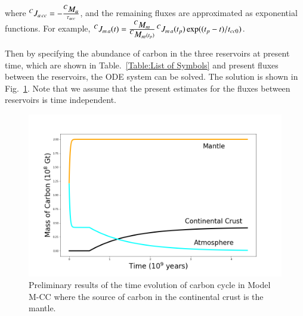 where $\mbox{${^CJ_{a\,cc}}$} = -\frac{\mbox{${^CM_{a}}$}}{\tau_{acc}}$, and the remaining fluxes are approximated as exponential functions. For example, $\mbox{${^CJ_{m\,a}}$}(t) = \frac{\mbox{${^CM_{m}}$}}{\mbox{${^CM_{m}}$}(t_p)}\, \mbox{${^CJ_{m\,a}}$}(t_p) \exp((t_p - t)/t_{cc0})$.

Then by specifying the abundance of carbon in the three reservoirs at present time, which are shown in Table.~\ref{Table:List of Symbols} and present fluxes between the reservoirs, the ODE system can be solved. The solution is shown in Fig.~\ref{Fig:ModelM-CC}. Note that we assume that the present estimates for the fluxes between reservoirs is time independent. 


\begin{figure}[h!]
  \centering
  \includegraphics[scale=0.4]{Figures/ModelM-CC.png}
  \caption{Preliminary results of the time evolution of carbon cycle in Model M-CC where the source of carbon in the continental crust is the mantle.}
  \label{Fig:ModelM-CC}
\end{figure}

